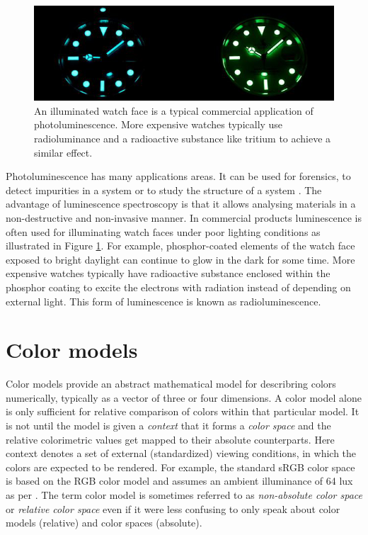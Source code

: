 \documentclass[thesis.tex]{subfiles}
\begin{document}
\begin{figure}[ht]
\centering \includegraphics[width=\textwidth]{images/photoluminescence_example}
\caption{An illuminated watch face is a typical commercial application of photoluminescence. More expensive watches typically use radioluminance and a radioactive substance like tritium to achieve a similar effect.\label{figure:photoluminescence_example}}
\end{figure}

Photoluminescence has many applications areas. It can be used for forensics, to detect impurities in a system or to study the structure of a system \cite{photoluminescence_use_case_2}\cite{photoluminescence_use_case_1}\cite{photoluminescence_use_case_3}. The advantage of luminescence spectroscopy is that it allows analysing materials in a non-destructive and non-invasive manner. In commercial products luminescence is often used for illuminating watch faces under poor lighting conditions as illustrated in Figure \ref{figure:photoluminescence_example}. For example, phosphor-coated elements of the watch face exposed to bright daylight can continue to glow in the dark for some time. More expensive watches typically have radioactive substance enclosed within the phosphor coating to excite the electrons with radiation instead of depending on external light. This form of luminescence is known as radioluminescence.

\section{Color models}
\label{section:rgbhsv}

Color models provide an abstract mathematical model for describring colors numerically, typically as a vector of three or four dimensions. A color model alone is only sufficient for relative comparison of colors within that particular model. It is not until the model is given a \textit{context} that it forms a \textit{color space} and the relative colorimetric values get mapped to their absolute counterparts. Here context denotes a set of external (standardized) viewing conditions, in which the colors are expected to be rendered. For example, the standard sRGB color space is based on the RGB color model and assumes an ambient illuminance of 64 lux as per \cite{iec}. The term color model is sometimes referred to as \textit{non-absolute color space} or \textit{relative color space} even if it were less confusing to only speak about color models (relative) and color spaces (absolute).
\end{document}
